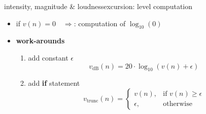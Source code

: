         \begin{frame}{intensity, magnitude \& loudness}{excursion: level computation}
            \begin{itemize}
                \item if $v(n) = 0\quad\Rightarrow$: computation of $\log_{10}(0)$
                \item<2-> \textbf{work-arounds}
                    \begin{enumerate}[a]
                        \item	add constant $\epsilon$
                            \begin{equation*}
                                v_\mathrm{dB}(n) = 20\cdot\log_{10}(v(n) + \epsilon)
                            \end{equation*}

                        \item<3->	add \textbf{if} statement	
                            \begin{equation*}
                                v_\mathrm{trunc}(n)  =   \left\{ 
                                            \begin{array}{ll} 
                                                v(n), & \text{if } v(n) \geq \epsilon \\
                                                \epsilon, & \text{otherwise }
                                            \end{array} 
                                            \right. 
                            \end{equation*}
                    \end{enumerate}
            \end{itemize}
        \end{frame}
        

